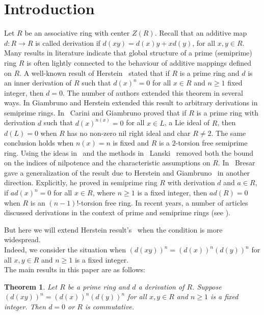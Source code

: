 \documentclass[12pt]{amsart}
\newtheorem{thm}{Theorem}[section]
\theoremstyle{definition}
\theoremstyle{remark}
\begin{document}
\section{Introduction}
 Let $R$ be an associative ring with center $Z(R)$.
 Recall that an additive
 map $d: R\rightarrow R$ is called derivation if
 $d(xy)=d(x)y+ xd(y)$, for all $x, y \in R$.
 Many results in literature indicate that global
 structure of a prime (semiprime) ring $R$ is
 often lightly connected to the behaviour of
 additive mappings defined on $R$.
 A well-known result of Herstein~\cite{a222} stated that
 if $R$ is a prime ring and $d$ is an inner
 derivation of $R$ such that $d(x)^n=0$ for all
 $x\in R$ and $n\geq 1$ fixed integer, then $d=0$.
 The number of authors extended this
 theorem in several ways.
 In \cite{a2} Giambruno and Herstein
 extended this result to arbitrary derivations
 in semiprime rings.
 In~\cite{a0001} Carini and Giambruno proved that if $R$
 is a prime ring with derivation $d$ such that
 $d(x)^{n(x)}=0$ for all $x\in L$, a Lie ideal of $R$,
 then $d(L)=0$ when $R$ has no non-zero nil right ideal and
 char $R\neq 2$. The same conclusion holds when
 $n(x)=n$ is fixed and $R$ is a $2$-torsion free
 semiprime ring.
 Using the ideas in~\cite{a0001} and the methods
 in~\cite{a02} Lanski~\cite{a003} removed both
 the bound on the indices  of nilpotence and the
 characteristic assumptions on $R$.
 In~\cite{a00001} Bresar gave a generalization of the
 result due to Herstein and  Giambruno~\cite{a2}
 in another direction. Explicitly, he proved
 in semiprime ring $R$ with derivation $d$
 and $a\in R$, if $ad(x)^n=0$ for all $x\in R$,
 where $n\geq 1$ is a fixed integer, then $ad(R)=0$ when
 $R$ is an $(n-1)!$-torsion free ring.
 In recent years, a number of articles discussed derivations
 in the context of prime and semiprime rings (see \cite{Carini, fili, sharma, dhara, Argac, dhara2}).

 \noindent
 But here we will extend  Herstein result's~\cite{a222}
 when the condition is more widespread.\\
 Indeed, we  consider  the situation when
 $(d(xy))^n=(d(x))^n(d(y))^n$ for all
 $x, y \in R$ and $n\geq 1$ is a fixed integer.\\

 \noindent
 The main results in this paper are as follows:
 \begin{thm}\label{b0}
 Let $R$ be a prime ring  and $d$
 a derivation of $R$. Suppose $(d(xy))^n=(d(x))^n(d(y))^n$ for all
 $x, y \in R$ and $n\geq 1$ is a fixed integer. Then $d=0$ or $R$ is
 commutative.
 \end{thm}
\end{document}
